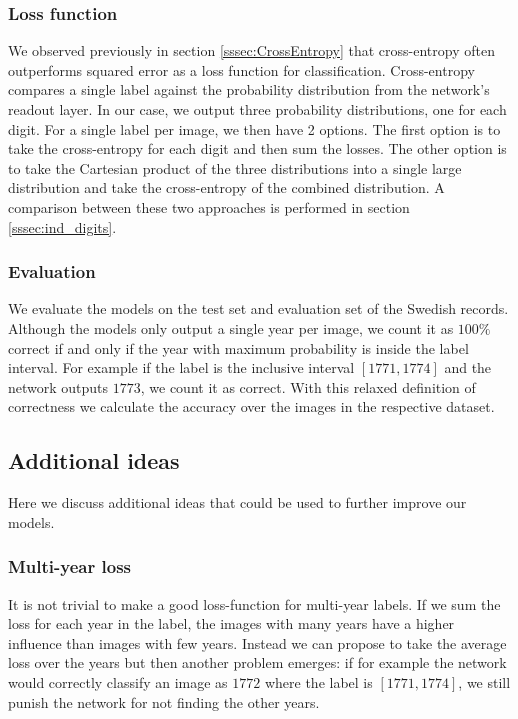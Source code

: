 \subsubsection{Loss function}

We observed previously in section \ref{sssec:CrossEntropy} that cross-entropy often outperforms squared error as a loss function for classification. Cross-entropy compares a single label against the probability distribution from the network's readout layer. In our case, we output three probability distributions, one for each digit.
For a single label per image, we then have 2 options.
The first option is to take the cross-entropy for each digit and then sum the losses.
The other option is to take the Cartesian product of the three distributions into a single large distribution and take the cross-entropy of the combined distribution. A comparison between these two approaches is performed in section \ref{sssec:ind_digits}.

\subsubsection{Evaluation}

We evaluate the models on the test set and evaluation set of the Swedish records. Although the models only output a single year per image, we count it as $100\%$ correct if and only if the year with maximum probability is inside the label interval. For example if the label is the inclusive interval $[1771, 1774]$ and the network outputs $1773$, we count it as correct. With this relaxed definition of correctness we calculate the accuracy over the images in the respective dataset.



\subsection{Additional ideas}

Here we discuss additional ideas that could be used to further improve our models.

\subsubsection{Multi-year loss}

It is not trivial to make a good loss-function for multi-year labels. If we sum the loss for each year in the label, the images with many years have a higher influence than images with few years. Instead we can propose to take the average loss over the years but then another problem emerges: if for example the network would correctly classify an image as $1772$ where the label is $[1771, 1774]$, we still punish the network for not finding the other years.

